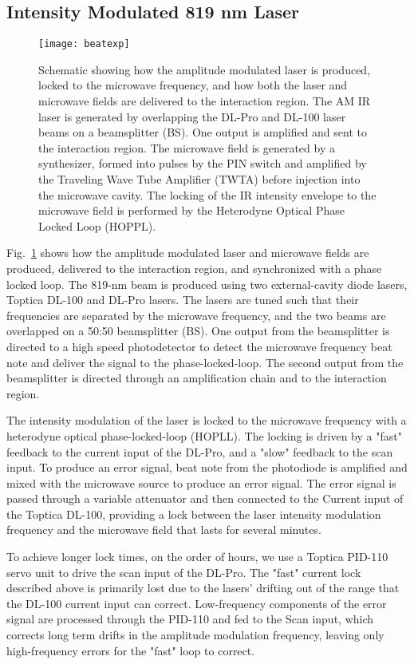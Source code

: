 \documentclass[aps,pra,preprint,groupedaddress]{revtex4-1}
\begin{document}
\subsection{\label{sec:ampmod} Intensity Modulated 819 nm Laser}

\begin{figure}
	\texttt{[image: beatexp]}
	\caption{Schematic showing how the amplitude modulated laser is produced, locked to the microwave frequency, and how both the laser and microwave fields are delivered to the interaction region. The AM IR laser is generated by overlapping the DL-Pro and DL-100 laser beams on a beamsplitter (BS). One output is amplified and sent to the interaction region. The microwave field is generated by a synthesizer, formed into pulses by the PIN switch and amplified by the Traveling Wave Tube Amplifier (TWTA) before injection into the microwave cavity. The locking of the IR intensity envelope to the microwave field is performed by the Heterodyne Optical Phase Locked Loop (HOPPL).}
	\label{fig:pll}
\end{figure}

Fig.~\ref{fig:pll} shows how the amplitude modulated laser and microwave fields are produced, delivered to the interaction region, and synchronized with a phase locked loop. The 819-nm beam is produced using two external-cavity diode lasers, Toptica DL-100 and DL-Pro lasers. The lasers are tuned such that their frequencies are separated by the microwave frequency, and the two beams are overlapped on a 50:50 beamsplitter (BS). One output from the beamsplitter is directed to a high speed photodetector to detect the microwave frequency beat note and deliver the signal to the phase-locked-loop. The second output from the beamsplitter is directed through an amplification chain and to the interaction region.

The intensity modulation of the laser is locked to the microwave frequency with a heterodyne optical phase-locked-loop (HOPLL). The locking is driven by a "fast" feedback to the current input of the DL-Pro, and a "slow" feedback to the scan input. To produce an error signal, beat note from the photodiode is amplified and mixed with the microwave source to produce an error signal. The error signal is passed through a variable attenuator and then connected to the Current input of the Toptica DL-100, providing a lock between the laser intensity modulation frequency and the microwave field that lasts for several minutes.

To achieve longer lock times, on the order of hours, we use a Toptica PID-110 servo unit to drive the scan input of the DL-Pro. The "fast" current lock described above is primarily lost due to the lasers' drifting out of the range that the DL-100 current input can correct. Low-frequency components of the error signal are processed through the PID-110 and fed to the Scan input, which corrects long term drifts in the amplitude modulation frequency, leaving only high-frequency errors for the "fast" loop to correct.
\end{document}
